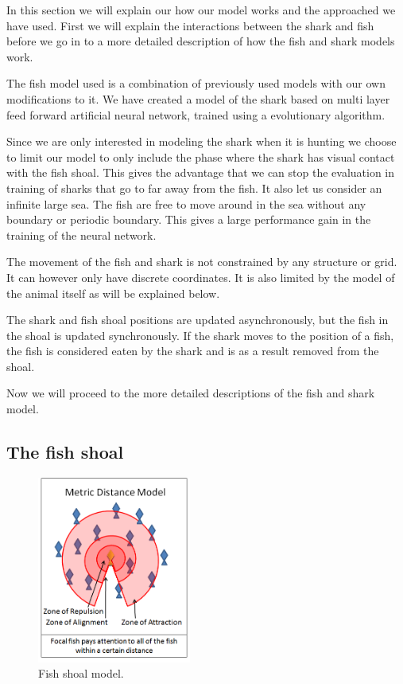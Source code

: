 In this section we will explain our how our model works and the approached we have used. First we will explain the interactions between the shark and fish before we go in to a more detailed description of how the fish and shark models work.

The fish model used is a combination of previously used models with our own modifications to it. We have created a model of the shark based on multi layer feed forward artificial neural network, trained using a evolutionary  algorithm.

Since we are only interested in modeling the shark when it is hunting we choose to limit our model to only include the phase where the shark has visual contact with the fish shoal. This gives the advantage that we can stop the evaluation in training of sharks that go to far away from the fish. It also let us consider an infinite large sea. The fish are free to move around in the sea without any boundary or periodic boundary. This gives a large performance gain in the training of the neural network.

The movement of the fish and shark is not constrained by any structure or grid. It can however only have discrete coordinates. It is also limited by the model of the animal itself as will be explained below.

The shark and fish shoal positions are updated asynchronously, but the fish in the shoal is updated synchronously. If the shark moves to the position of a fish, the fish is considered eaten by the shark and is as a result removed from the shoal.

Now we will proceed to the more detailed descriptions of the fish and shark model.

\subsection{The fish shoal}

\begin{figure}
\centering
\includegraphics[width=0.45\textwidth]{figs/swarmfig.png}
\caption{\label{fig:swarm} Fish shoal model.}
\end{figure}

